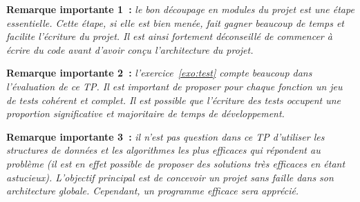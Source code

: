 \documentclass[11pt]{article}
\theoremstyle{definition}
\begin{document}
{\bf Remarque importante 1~:} {\it le bon découpage en modules du projet
est une étape essentielle. Cette étape, si elle est bien menée, fait
gagner beaucoup de temps et facilite l'écriture du projet. Il est ainsi
fortement déconseillé de commencer à écrire du code avant d'avoir conçu
l'architecture du projet.}
\bigskip
\bigskip

{\bf Remarque importante 2~:} {\it l'exercice~\ref{exo:test} compte
beaucoup dans l'évaluation de ce TP. Il est important de proposer pour
chaque fonction un jeu de tests cohérent et complet. Il est possible que
l'écriture des tests occupent une proportion significative et majoritaire
de temps de développement.}
\bigskip
\bigskip

{\bf Remarque importante 3~:} {\it il n'est pas question dans ce TP
d'utiliser les structures de données et les algorithmes les plus
efficaces qui répondent au problème (il est en effet possible de
proposer des solutions très efficaces en étant astucieux). L'objectif
principal est de concevoir un projet sans faille dans son architecture
globale. Cependant, un programme efficace sera apprécié.}
\end{document}
